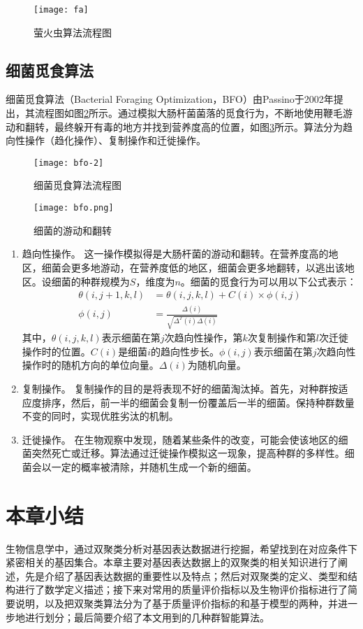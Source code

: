   \begin{figure}[htbp]
    \centering
    \texttt{[image: fa]}
    \caption{萤火虫算法流程图}
    \label{fig:fa}
  \end{figure}

  \subsection{细菌觅食算法}
  细菌觅食算法（Bacterial Foraging Optimization，BFO）由Passino于2002年提出，其流程图如图\ref{fig:bfo-2}所示。通过模拟大肠杆菌菌落的觅食行为，不断地使用鞭毛游动和翻转，最终躲开有毒的地方并找到营养度高的位置，如图\ref{fig:bfo}所示。算法分为趋向性操作（趋化操作）、复制操作和迁徙操作。
  \begin{figure}[htbp]
    \centering
    \texttt{[image: bfo-2]}
    \caption{细菌觅食算法流程图}
    \label{fig:bfo-2}
  \end{figure}
  
  \begin{figure}[htbp]
    \centering
    \texttt{[image: bfo.png]}
    \caption{细菌的游动和翻转}
    \label{fig:bfo}
  \end{figure}

  \begin{enumerate}
    \item[1.] 趋向性操作。 
    这一操作模拟得是大肠杆菌的游动和翻转。在营养度高的地区，细菌会更多地游动，在营养度低的地区，细菌会更多地翻转，以逃出该地区。设细菌的种群规模为$S$，维度为$n$。细菌的觅食行为可以用以下公式表示：
    \begin{align}
      \theta(i,j+1,k,l) &= \theta(i,j,k,l) + C(i) \times \phi(i,j) \\
      \phi(i,j) &= \frac{\Delta(i)}{\sqrt{\Delta^T(i)\Delta(i)}}
    \end{align}
    其中，$\theta(i,j,k,l)$表示细菌在第$j$次趋向性操作，第$k$次复制操作和第$l$次迁徙操作时的位置。$C(i)$是细菌$i$的趋向性步长。$\phi(i,j)$表示细菌在第$j$次趋向性操作时的随机方向的单位向量。$\Delta(i)$为随机向量。

    \item[2.] 复制操作。
    复制操作的目的是将表现不好的细菌淘汰掉。首先，对种群按适应度排序，然后，前一半的细菌会复制一份覆盖后一半的细菌。保持种群数量不变的同时，实现优胜劣汰的机制。

    \item[3.] 迁徙操作。
    在生物观察中发现，随着某些条件的改变，可能会使该地区的细菌突然死亡或迁移。算法通过迁徙操作模拟这一现象，提高种群的多样性。细菌会以一定的概率被清除，并随机生成一个新的细菌。
    
  \end{enumerate}

\section{本章小结}
生物信息学中，通过双聚类分析对基因表达数据进行挖掘，希望找到在对应条件下紧密相关的基因集合。本章主要对基因表达数据上的双聚类的相关知识进行了阐述，先是介绍了基因表达数据的重要性以及特点；然后对双聚类的定义、类型和结构进行了数学定义描述；接下来对常用的质量评价指标以及生物评价指标进行了简要说明，以及把双聚类算法分为了基于质量评价指标的和基于模型的两种，并进一步地进行划分；最后简要介绍了本文用到的几种群智能算法。